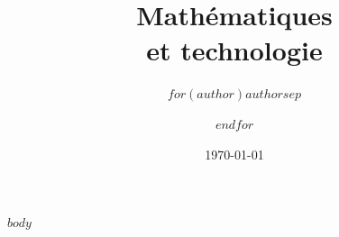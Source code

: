 \documentclass{livrejs}
\title{Mathématiques\\[2pt]
       et technologie}
\author{$for(author)$$author$$sep$ \and $endfor$}
\date{\today}
\begin{document}
$body$
\end{document}

